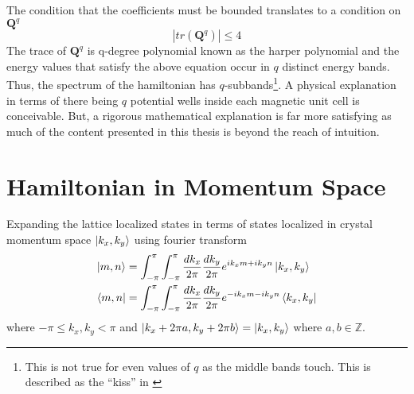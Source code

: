 The condition that the coefficients must be bounded translates to a condition on $\mathbf{Q}^{q}$
\begin{equation}
 |tr(\mathbf{Q}^{q})| \leq 4
\end{equation} The trace of $\mathbf{Q}^{q}$ is q-degree polynomial known as the harper polynomial \cite{hofstadter1976energy, butler1968model,satija2016butterfly} and the energy values
that satisfy the above equation occur in $q$ distinct energy bands. Thus, the spectrum of the hamiltonian has $q$-subbands\footnote{This is not true for even values of $q$ as the middle bands touch. This is
described as the ``kiss'' in \parencite{hofstadter1976energy,satija2016butterfly}}. A physical explanation in terms of there being $q$ potential wells inside each magnetic unit cell is conceivable. But, a 
rigorous mathematical explanation is far more satisfying as much of the content presented in this thesis is beyond the reach of intuition.

\section{Hamiltonian in Momentum Space}
Expanding the lattice localized states in terms of states localized in crystal momentum space $\ket{k_x, k_y}$ using fourier transform
\begin{align}
 \ket{m, n} &= \int_{-\pi}^{\pi}\int_{-\pi}^{\pi}\frac{dk_{x}}{2\pi}\frac{dk_{y}}{2\pi}e^{ik_xm+ik_yn}\ket{k_x, k_y} \\
 \bra{m, n} &= \int_{-\pi}^{\pi}\int_{-\pi}^{\pi}\frac{dk_{x}}{2\pi}\frac{dk_{y}}{2\pi}e^{-ik_xm-ik_yn}\bra{k_x, k_y}
\end{align} where $-\pi \leq k_x, k_y < \pi$ and $\ket{k_x + 2\pi a, k_y + 2\pi b} = \ket{k_x, k_y}$ where $a, b \in \mathbb{Z}$.

